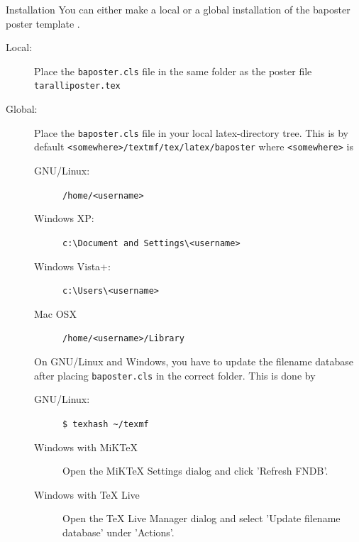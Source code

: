 \documentclass[a0paper,portrait]{baposter}
\begin{document}
\begin{poster}
\begin{posterbox}[name=install,span=2,column=1,row=0]{Installation}
You can either make a local or a global installation of the baposter poster template \cite{baposter}.
\begin{description}
  \item[Local:] Place the {\tt baposter.cls} file in the same folder as the poster file {\tt taralliposter.tex}
  \item[Global:] Place the {\tt baposter.cls} file in your local latex-directory tree. This is by default {\tt <somewhere>/textmf/tex/latex/baposter} where {\tt <somewhere>} is
  \begin{description}
    \item[GNU/Linux:] {\tt/home/<username>}
    \item[Windows XP:] {\tt c:\textbackslash Document and Settings\textbackslash<username>}
    \item[Windows Vista+:] {\tt c:\textbackslash Users\textbackslash<username>}
    \item[Mac OSX] {\tt/home/<username>/Library}
  \end{description}
  On GNU/Linux and Windows, you have to update the filename database after placing {\tt baposter.cls} in the correct folder. This is done by
  \begin{description}
    \item[GNU/Linux:] {\tt \$ texhash \textasciitilde /texmf}
    \item[Windows with MiKTeX] Open the MiKTeX Settings dialog and click 'Refresh FNDB'.
    \item[Windows with TeX Live] Open the TeX Live Manager dialog and select 'Update filename database' under 'Actions'.
  \end{description}
\end{description}
\end{posterbox}


\end{poster}
\end{document}
